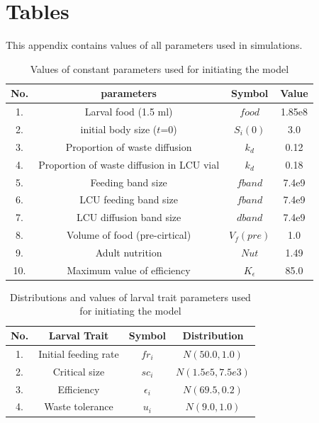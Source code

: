 \chapter{Tables}
This appendix contains values of all parameters used in simulations.

\begin{table}[h]
  \centering
  \begin{tabular}{|c|c|c|c|}
    \hline
    \textbf{No.} & \textbf{parameters} & \textbf{Symbol} & \textbf{Value} \\
    \hline
    1. & Larval food (1.5 ml) & $food$ & 1.85e8 \\
    \hline
    2. & initial body size ($t$=0) & $S_{i}(0)$ & 3.0 \\
    \hline
    3. & Proportion of waste diffusion & $k_{d}$ & 0.12 \\
    \hline
    4. & Proportion of waste diffusion in LCU vial & $k_{d}$ & 0.18 \\
    \hline
    5. & Feeding band size & $fband$ & 7.4e9 \\
    \hline
    6. & LCU feeding band size & $fband$ & 7.4e9 \\
    \hline
    7. & LCU diffusion band size & $dband$ & 7.4e9 \\
    \hline
    8. & Volume of food (pre-cirtical) & $V_{f}(pre)$ & 1.0 \\
    \hline
    9. & Adult nutrition & $Nut$ & 1.49 \\
    \hline
    10. & Maximum value of efficiency & $K_{\epsilon}$ & 85.0 \\
    \hline
  \end{tabular}
  \caption{Values of constant parameters used for initiating the model}
  \label{tab:food_param}
\end{table}

\begin{table}[p]
  \centering
  \begin{tabular}{|c|c|c|c|}
    \hline
    \textbf{No.} & \textbf{Larval Trait} & \textbf{Symbol} & \textbf{Distribution} \\
    \hline
    1. & Initial feeding rate & $fr_{i}$ & $N(50.0,1.0)$ \\
    \hline
    2. & Critical size & $sc_{i}$ & $N(1.5e5,7.5e3)$ \\
    \hline
    3. & Efficiency & $\epsilon_{i}$ & $N(69.5,0.2)$ \\
    \hline
    4. & Waste tolerance & $u_{i}$ & $N(9.0,1.0)$ \\
    \hline
  \end{tabular}
  \caption{Distributions and values of larval trait parameters used for initiating the model}
  \label{tab:trait_value}
\end{table}

